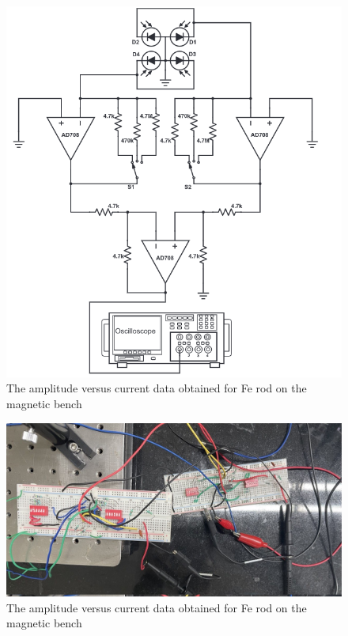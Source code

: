 \begin{figure}[H]
	\centering
	\includegraphics[scale=0.7]{screenshot001}
	\caption{The amplitude versus current data obtained for Fe rod on the magnetic bench}
	\label{fig:screenshot001}
\end{figure}
\begin{figure}[H]
	\centering
	\includegraphics[scale=0.3]{breadboard.jpeg}
	\caption{The amplitude versus current data obtained for Fe rod on the magnetic bench}
	\label{fig:mb-fe-0}
\end{figure}


